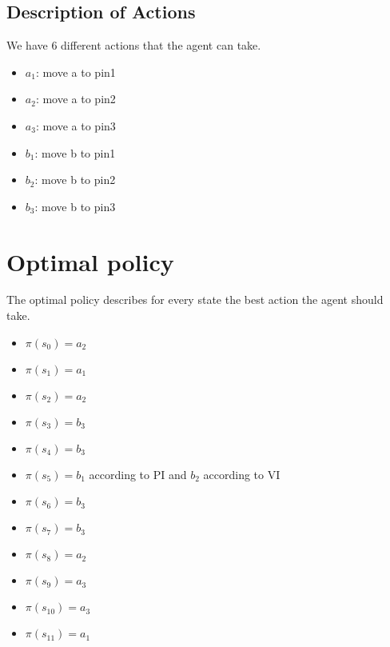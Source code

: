 \documentclass[a4paper]{article}
\begin{document}
\subsection{Description of Actions}
We have 6 different actions that the agent can take.
\begin{multicols}{2}
\begin{itemize}
\item $a_{1}$: move a to pin1
\item $a_{2}$: move a to pin2
\item $a_{3}$: move a to pin3
\item $b_{1}$: move b to pin1
\item $b_{2}$: move b to pin2
\item $b_{3}$: move b to pin3
\end{itemize}
\end{multicols}

\section{Optimal policy}
The optimal policy describes for every state the best action the agent should take.

\begin{multicols}{2}
\begin{itemize}
\item $\pi(s_{0}) = a_{2}$
\item $\pi(s_{1}) = a_{1}$
\item $\pi(s_{2}) = a_{2}$
\item $\pi(s_{3}) = b_{3}$
\item $\pi(s_{4}) = b_{3}$
\item $\pi(s_{5}) = b_{1}$ according to PI and $b_{2}$ according to VI
\item $\pi(s_{6}) = b_{3}$
\item $\pi(s_{7}) = b_{3}$
\item $\pi(s_{8}) = a_{2}$
\item $\pi(s_{9}) = a_{3}$
\item $\pi(s_{10}) = a_{3}$
\item $\pi(s_{11}) = a_{1}$
\end{itemize}
\end{multicols}
\end{document}
